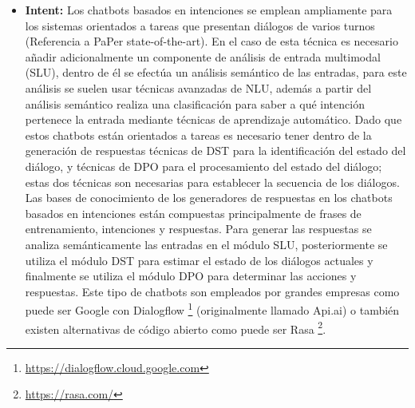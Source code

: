 \begin{itemize}
\item \textbf{Intent:} Los chatbots basados en intenciones se emplean ampliamente para los sistemas orientados a tareas que presentan diálogos de varios turnos (Referencia a PaPer state-of-the-art). En el caso de esta técnica es necesario añadir adicionalmente un componente de análisis de entrada multimodal (SLU), dentro de él se efectúa un análisis semántico de las entradas, para este análisis se suelen usar técnicas avanzadas de NLU, además a partir del análisis semántico realiza una clasificación para saber a qué intención pertenece la entrada mediante técnicas de aprendizaje automático. Dado que estos chatbots están orientados a tareas es necesario tener dentro de la generación de respuestas técnicas de DST para la identificación del estado del diálogo, y técnicas de DPO para el procesamiento del estado del diálogo; estas dos técnicas son necesarias para establecer la secuencia de los diálogos. Las bases de conocimiento de los generadores de respuestas en los chatbots basados en intenciones están compuestas principalmente de frases de entrenamiento, intenciones y respuestas. Para generar las respuestas se analiza semánticamente las entradas en el módulo SLU, posteriormente se utiliza el módulo DST para estimar el estado de los diálogos actuales y finalmente se utiliza el módulo DPO para determinar las acciones y respuestas. Este tipo de chatbots son empleados por grandes empresas como puede ser Google con Dialogflow \footnote{\url{https://dialogflow.cloud.google.com}} (originalmente llamado Api.ai) o también existen alternativas de código abierto como puede ser Rasa \footnote{\url{https://rasa.com/}}.

\end{itemize}
